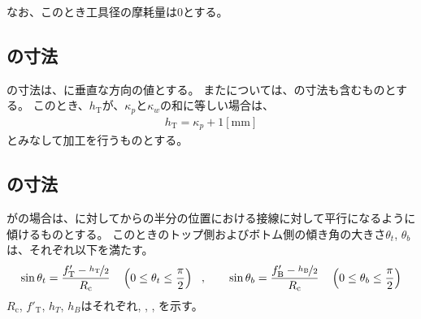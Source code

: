 なお、このとき工具径の摩耗量は0とする。


\subsection{\nameOutcutLength の寸法}
\nameOutcutLength の寸法は、\EndFace に垂直な方向の値とする。
また\TopOutcutLength については、\KeywayWidth の寸法も含むものとする。
このとき、\TopOutcutLength$h_\mathrm T$が、\KeywayPos$\kappa_p$と\KeywayWidth$\kappa_w$の和に等しい場合は、
\begin{align*}
  h_\mathrm T = \kappa_p+1[\text{mm}]
\end{align*}
とみなして加工を行うものとする。


\subsection{\nameCurvedOutcut の寸法}
\Outcut が\CurvedOutcut の場合は、\CenterCurvatureLine に対して\EndFace から\OutcutLength の半分の位置における接線に対して平行になるように傾けるものとする。
このときのトップ側およびボトム側の傾き角の大きさ$\theta_t$, $\theta_b$は、それぞれ以下を満たす。
\begin{align*}
  \sin\theta_t = \frac{f_\mathrm T'-\nicefrac{h_\mathrm T}2}{R_\mathrm c}
  \quad\left(0 \leq \theta_t \leq \frac\pi2\right)~~,\qquad
  \sin\theta_b = \frac{f_\mathrm B'-\nicefrac{h_\mathrm B}2}{R_\mathrm c}
  \quad\left(0 \leq \theta_b \leq \frac\pi2\right)
\end{align*}
$R_\mathrm c$, $f'_\mathrm T$, $h_T$, $h_B$はそれぞれ\CenterCurvatureRadius, \TopReAlocationLength, \TopOutcutLength, \BottomOutcutLength を示す。



\clearpage


